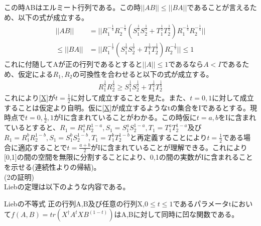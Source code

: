 \documentclass[a4paper,10.5pt]{article}
\numberwithin{equation}{section}
\begin{document}
この時ABはエルミート行列である。この時$||AB||\leq||BA||$であることが言えるため、以下の式が成立する。
\begin{equation}\begin{split}
    ||AB||&=||R_{1}^{-\frac{1}{4}}R_{2}^{-\frac{1}{4}}(S_{1}^{\frac{1}{2}}S_{2}^{\frac{1}{2}}+T_{1}^{\frac{1}{2}}T_{2}^{\frac{1}{2}})R_{1}^{-\frac{1}{4}}R_{2}^{-\frac{1}{4}}||\\
    \leq ||BA||&=||R_{1}^{-\frac{1}{2}}(S_{1}^{\frac{1}{2}}S_{2}^{\frac{1}{2}}+T_{1}^{\frac{1}{2}}T_{2}^{\frac{1}{2}})R_{2}^{-\frac{1}{2}}||\leq 1
\end{split} \end{equation}
これに付随してAが正の行列であるとすると$||A||\leq 1$であるなら$A<I$であるため、仮定による$R_{1},R_{2}$の可換性を合わせると以下の式が成立する。
\begin{equation}\begin{split}
    R_{1}^{\frac{1}{2}}R_{2}^{\frac{1}{2}}\geq S_{1}^{\frac{1}{2}}S_{2}^{\frac{1}{2}} + T_{1}^{\frac{1}{2}}T_{2}^{\frac{1}{2}}
\end{split} \end{equation}
これにより\eqref{X}が$t=\frac{1}{2}$に対して成立することを見た。また、$t=0,1$に対して成立することは仮定より自明。仮に\eqref{X}が成立するようなtの集合をIであるとする。現時点で$t=0,\frac{1}{2},1$がIに含まれていることがわかる。この時仮に$t=a,b$をIに含まれているとすると、$R_{1}=R_{1}^{a}R_{2}^{1-a},S_{1}=S_{1}^{a}S_{2}^{1-a},T_{1}=T_{1}^{a}T_{2}^{1-a}$及び$R_{1}=R_{1}^{b}R_{2}^{1-b},S_{1}=S_{1}^{b}S_{2}^{1-b},T_{1}=T_{1}^{b}T_{2}^{1-b}$と再定義することにより$t=\frac{1}{2}$である場合に適応することで$t=\frac{a+b}{2}$がIに含まれていることが理解できる。これにより[0,1]の間の空間を無限に分割することにより、0,1の間の実数がIに含まれることを示せる(連続性よりの帰結)。\\

(2の証明)\\
Liebの定理は以下のような内容である。
\begin{itembox}[l]{Liebの不等式}
    正の行列A,B及び任意の行列X,$0\leq t\leq 1$であるパラメータtにおいて$f(A,B)=tr(X^{\dagger}A^{t}XB^{(1-t)})$はA,Bに対して同時に凹な関数である。
\end{itembox}
\end{document}
